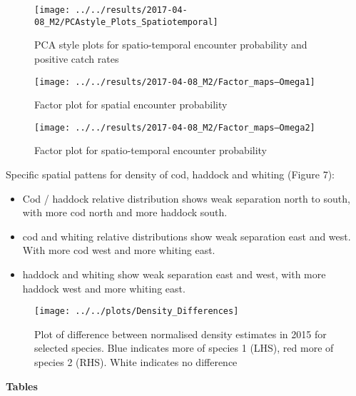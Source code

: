 \documentclass[11pt]{article}
\begin{document}
\begin{figure}[!ht]
	\texttt{[image: ../../results/2017-04-08\_M2/PCAstyle\_Plots\_Spatiotemporal]}
	\label{fig:PCA2}
	\caption{PCA style plots for spatio-temporal encounter probability and
		positive catch rates}
\end{figure}

\begin{figure}[!ht]
	\texttt{[image: ../../results/2017-04-08\_M2/Factor\_maps--Omega1]}
	\label{fig:FactMap1}
	\caption{Factor plot for spatial encounter probability}
\end{figure}

\begin{figure}[!ht]
	\texttt{[image: ../../results/2017-04-08\_M2/Factor\_maps--Omega2]}
	\label{fig:FactMap2}
	\caption{Factor plot for spatio-temporal encounter probability}
\end{figure}

Specific spatial pattens for density of cod, haddock and whiting (Figure 7):

\begin{itemize}
	\item Cod / haddock relative distribution shows weak separation north to
	south, with more cod north and more haddock south.
	\item cod and whiting relative distributions show weak separation east
		and west. With more cod west and more whiting east.
	\item haddock and whiting show weak separation east and west, with
		more haddock west and more whiting east.
\end{itemize}

\begin{figure}[!ht]
	\texttt{[image: ../../plots/Density\_Differences]}
	\label{fig:DensityDiff}
	\caption{Plot of difference between normalised density estimates in
		2015 for selected species. Blue indicates more of species 1
		(LHS),	red more of species 2 (RHS). White indicates no
		difference}
\end{figure}



\newpage

\textbf{Tables}
\end{document}
